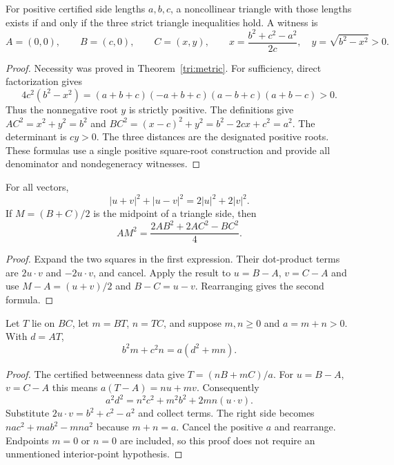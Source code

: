 \begin{theorem}
\label{tri:side-construction}
For positive certified side lengths $a,b,c$, a noncollinear triangle with
those lengths exists if and only if the three strict triangle inequalities
hold.  A witness is
\[
 A=(0,0),\qquad B=(c,0),\qquad C=(x,y),\qquad
 x=\frac{b^2+c^2-a^2}{2c},\quad y=\sqrt{b^2-x^2}>0.
\]
\end{theorem}
\begin{proof}
Necessity was proved in Theorem~\ref{tri:metric}.  For sufficiency, direct
factorization gives
\[
 4c^2(b^2-x^2)
 =(a+b+c)(-a+b+c)(a-b+c)(a+b-c)>0.
\]
Thus the nonnegative root $y$ is strictly positive.  The definitions give
$AC^2=x^2+y^2=b^2$ and
$BC^2=(x-c)^2+y^2=b^2-2cx+c^2=a^2$.
The determinant is $cy>0$.  The three distances are the designated
positive roots.  These formulas use a single positive square-root
construction and provide all denominator and nondegeneracy witnesses.
\end{proof}

\begin{theorem}
\label{tri:apollonius}
For all vectors,
\[
 |u+v|^2+|u-v|^2=2|u|^2+2|v|^2.
\]
If $M=(B+C)/2$ is the midpoint of a triangle side, then
\[
 AM^2=\frac{2AB^2+2AC^2-BC^2}{4}.
\]
\end{theorem}
\begin{proof}
Expand the two squares in the first expression.  Their dot-product
terms are $2u\mathbin{\cdot}v$ and $-2u\mathbin{\cdot}v$, and cancel.
Apply the result to $u=B-A$, $v=C-A$ and use
$M-A=(u+v)/2$ and $B-C=u-v$.  Rearranging gives the second formula.
\end{proof}

\begin{theorem}
\label{tri:stewart}
Let $T$ lie on $BC$, let $m=BT$, $n=TC$, and suppose $m,n\ge0$ and
$a=m+n>0$.  With $d=AT$,
\[
 b^2m+c^2n=a(d^2+mn).
\]
\end{theorem}
\begin{proof}
The certified betweenness data give
$T=(nB+mC)/a$.  For $u=B-A$, $v=C-A$ this means
$a(T-A)=nu+mv$.  Consequently
\[
 a^2d^2=n^2c^2+m^2b^2+2mn(u\mathbin{\cdot}v).
\]
Substitute $2u\mathbin{\cdot}v=b^2+c^2-a^2$ and collect terms.  The
right side becomes
$na c^2+ma b^2-mna^2$ because $m+n=a$.
Cancel the positive $a$ and rearrange.  Endpoints $m=0$ or $n=0$ are
included, so this proof does not require an unmentioned interior-point
hypothesis.
\end{proof}

